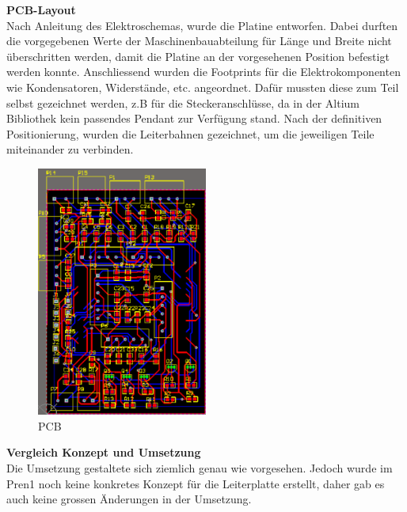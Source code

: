 \textbf{PCB-Layout}
\\[0.2cm]
Nach Anleitung des Elektroschemas, wurde die Platine entworfen. Dabei durften die vorgegebenen Werte der Maschinenbauabteilung für Länge und Breite nicht überschritten werden, damit die Platine an der vorgesehenen Position befestigt werden konnte. Anschliessend wurden die Footprints für die Elektrokomponenten wie Kondensatoren, Widerstände, etc. angeordnet. Dafür mussten diese zum Teil selbst gezeichnet werden, z.B für die Steckeranschlüsse, da in der Altium Bibliothek kein passendes Pendant zur Verfügung stand.
Nach der definitiven Positionierung, wurden die Leiterbahnen gezeichnet, um die jeweiligen Teile miteinander zu verbinden.
\\[0.2cm]
\begin{figure}[H]
\centering
\includegraphics[width=0.5\textwidth]{03_Loesungskonzept/pictures/pcb_print.png}
\caption{PCB}	
\end{figure}
\textbf{Vergleich Konzept und Umsetzung}\\[0.2cm]
Die Umsetzung gestaltete sich ziemlich genau wie vorgesehen. Jedoch wurde im Pren1 noch keine konkretes Konzept für die Leiterplatte erstellt, daher gab es auch keine grossen Änderungen in der Umsetzung.
